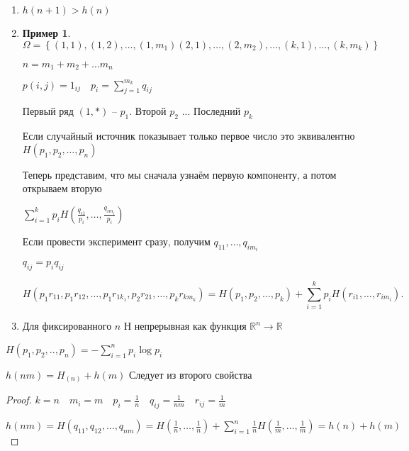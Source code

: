 \documentclass{book}
\newcommand\R{\ensuremath{\mathbb{R}}}
\theoremstyle{definition}
\newtheorem*{example}{Пример}
\begin{document}
     \begin{enumerate}
         \item $h(n+1)>h(n)$
         \item 

             \begin{example}
                 $\Omega = \left\{ (1,1), (1, 2), \ldots, (1, m_1) (2, 1), \ldots, (2, m_2), \ldots, (k, 1), \ldots, (k, m_k) \right\} $

                 $n = m_1+m_2+\ldots m_n$

                 $p(i,j) = 1_{ij}\quad p_i = \sum_{j=1}^{m_k} q_{ij}$ 

                 Первый ряд $(1,*)$ --  $p_1$. Второй $p_2$ ... Последний $p_k$

                 Если случайный источник показывает только первое число это эквивалентно  $H(p_1, p_2, \ldots, p_n)$


                 Теперь представим, что мы сначала узнаём первую компоненту, а потом открываем вторую

                 $\sum_{i=1}^k p_i  H\left( \frac{q_{i 1}}{p_i}, \ldots, \frac{q_{i m_i}}{p_i}  \right) $ 

                 Если провести эксперимент сразу, получим $q_{11}, \ldots, q_{i m_i}$ 

                 $q_{ij} = p_i q_{ij}$
                    
             \end{example}

             \[
                 H\left( p_1r_{11}, p_{1}r_{12}, \ldots, p_1r_{1k_1}, p_2r_{21}, \ldots, p_kr_{km_k} \right) = H\left( p_1, p_2, \ldots, p_k \right)   + \sum_{i=1}^{k} p_iH\left( r_{i1}, \ldots, r_{i m_i}  \right) 
             .\] 
             
             \item Для фиксированного $n$ Н непрерывная как функция $\R^n \to \R$
     \end{enumerate}

     \begin{theorem}
         $H\left( p_1, p_2, .., p_n \right) = -\sum_{i=1}^{n} p_i \log p_i$
     \end{theorem}
     \begin{lemma}
         $h\left( nm \right)  = H_(n) + h(m)$ Следует из второго свойства
     \end{lemma}
     \begin{proof}
         $k=n\quad m_i = m\quad p_i = \frac{1}{n}\quad q_{ij} = \frac{1}{nm}\quad r_{ij} = \frac{1}{m}$ 

         $h(nm) = H\left( q_{11}, q_{12}, \ldots, q_{nm} \right)  =  H\left( \frac{1}{n}, \ldots, \frac{1}{n} \right) + \sum_{i=1}^{n} \frac{1}{n} H\left( \frac{1}{m}, \ldots, \frac{1}{m} \right) =h(n) + h(m)$
     \end{proof}
\end{document}
